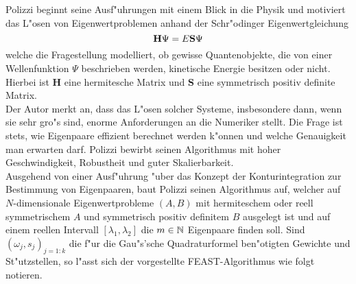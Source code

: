 Polizzi beginnt seine Ausf"uhrungen mit einem Blick in die Physik und motiviert das L"osen von Eigenwertproblemen anhand der Schr"odinger Eigenwertgleichung
\[
\textbf{\text{H}}\Psi = E\textbf{\text{S}}\Psi
\]
welche die Fragestellung modelliert, ob gewisse Quantenobjekte, die von einer Wellenfunktion $\Psi$ beschrieben werden, kinetische Energie besitzen oder nicht. Hierbei ist \textbf{H} eine hermitesche Matrix und \textbf{S} eine symmetrisch positiv definite Matrix.\\

Der Autor merkt an, dass das L"osen solcher Systeme, insbesondere dann, wenn sie sehr gro"s sind, enorme Anforderungen an die Numeriker stellt. Die Frage ist stets, wie Eigenpaare effizient berechnet werden k"onnen und welche Genauigkeit man erwarten darf. Polizzi bewirbt seinen Algorithmus mit hoher Geschwindigkeit, Robustheit und guter Skalierbarkeit.\\ %

Ausgehend von einer Ausf"uhrung "uber das Konzept der Konturintegration zur Bestimmung von Eigenpaaren, baut Polizzi seinen Algorithmus auf, welcher auf $N$-dimensionale Eigenwertprobleme $(A,B)$ mit hermiteschem oder reell symmetrischem $A$ und symmetrisch positiv definitem $B$ ausgelegt ist und auf einem reellen Intervall $[\lambda_1,\lambda_2]$ die $m\in\mathbb{N}$ Eigenpaare finden soll.
Sind $(\omega_j, s_j)_{j=1:k}$ die f"ur die Gau"s'sche Quadraturformel ben"otigten Gewichte und St"utzstellen, so l"asst sich der vorgestellte FEAST-Algorithmus wie folgt notieren.


